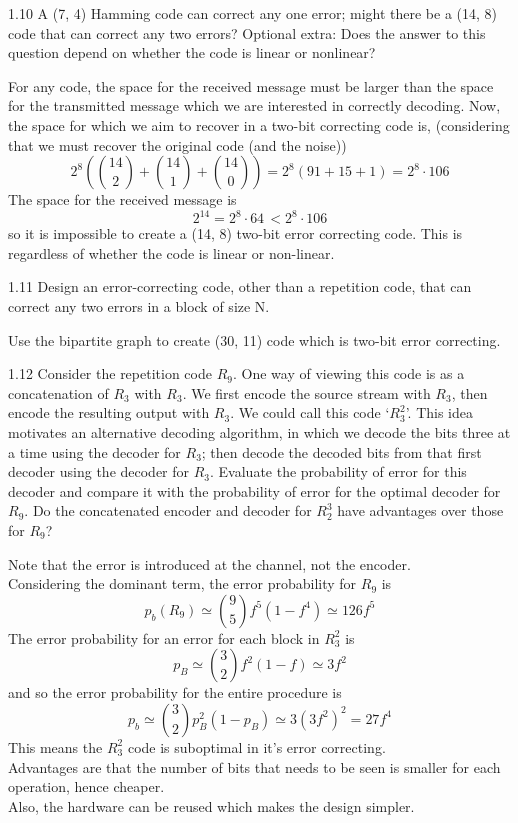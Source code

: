 \documentclass[12pt, a4paper]{article}
\begin{document}
\begin{prob}{1.10}
     A (7, 4) Hamming code can correct any one error; might
there be a (14, 8) code that can correct any two errors?
Optional extra: Does the answer to this question depend on whether the
code is linear or nonlinear?
\end{prob}
\begin{sol}
For any code, the space for the received message must be larger than the space for the transmitted message which we are interested in correctly decoding.
Now, the space for which we aim to recover in a two-bit correcting code is, (considering that we must recover the original code (and the noise))
$$
2^8 (\binom{14}{2} + \binom{14}{1} + \binom{14}{0}) = 2^8 (91 + 15 + 1) = 2^8 \cdot 106
$$
The space for the received message is
$$
2^{14} = 2^8 \cdot 64 \, < 2^8 \cdot 106
$$
so it is impossible to create a (14, 8) two-bit error correcting code.
This is regardless of whether the code is linear or non-linear.
\end{sol}
\bigskip

\begin{prob}{1.11}
Design an error-correcting code, other than a repetition
code, that can correct any two errors in a block of size N.
\end{prob}
\begin{sol}
Use the bipartite graph to create (30, 11) code which is two-bit error correcting.
\end{sol}
\bigskip

\begin{prob}{1.12}
    Consider the repetition code $R_9$. One way of viewing
this code is as a concatenation of $R_3$ with $R_3$. We first encode the
source stream with $R_3$, then encode the resulting output with $R_3$. We
could call this code ‘$R_3^2$’. This idea motivates an alternative decoding
algorithm, in which we decode the bits three at a time using the decoder
for $R_3$; then decode the decoded bits from that first decoder using the
decoder for $R_3$.
Evaluate the probability of error for this decoder and compare it with
the probability of error for the optimal decoder for $R_9$.
Do the concatenated encoder and decoder for $R_2^3$ have advantages over
those for $R_9$?
\end{prob}
\begin{sol}
Note that the error is introduced at the channel, not the encoder. \\
Considering the dominant term, the error probability for $R_9$ is 
$$p_b(R_9) \simeq \binom{9}{5} f^5 (1-f^4) \simeq 126 f^5 $$
The error probability for an error for each block in $R_3^2$ is
$$
p_B \simeq \binom{3}{2} f^2 (1-f) \simeq 3f^2
$$
and so the error probability for the entire procedure is 
$$
p_b \simeq \binom{3}{2} p_B^2 (1-p_B) \simeq 3 (3f^2)^2 = 27f^4
$$
This means the $R_3^2$ code is suboptimal in it's error correcting. \\
Advantages are that the number of bits that needs to be seen is smaller for each operation, hence cheaper. \\
Also, the hardware can be reused which makes the design simpler.
\end{sol}
\bigskip


\end{document}
